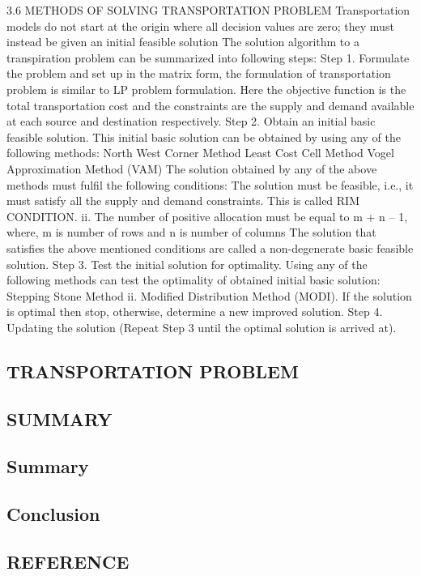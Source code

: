 \documentclass{article}
\begin{document}
3.6 METHODS OF SOLVING TRANSPORTATION PROBLEM 
Transportation models do not start at the origin where all decision values are zero; they must instead be given an initial feasible solution The solution algorithm to a transpiration problem can be summarized into following steps: 
Step 1. Formulate the problem and set up in the matrix form, the formulation of transportation problem is similar to LP problem formulation. Here the objective function is the total transportation cost and the constraints are the supply and demand available at each source and destination respectively. 
Step 2. Obtain an initial basic feasible solution. This initial basic solution can be obtained by using any of the following methods: 
North West Corner Method 
Least Cost Cell Method 
Vogel Approximation Method  (VAM)
The solution obtained by any of the above methods must fulfil the following conditions: 
The solution must be feasible, i.e., it must satisfy all the supply and demand constraints. This is called RIM CONDITION. 
ii. The number of positive allocation must be equal to m + n – 1, where, m is number of rows and n is number of columns
The solution that satisfies the above mentioned conditions are called a non-degenerate basic feasible solution. 
Step 3. Test the initial solution for optimality. Using any of the following methods can test the optimality of obtained initial basic solution: 
Stepping Stone Method 
ii. Modified Distribution Method (MODI).
If the solution is optimal then stop, otherwise, determine a new improved solution. 
Step 4. Updating the solution (Repeat Step 3 until the optimal solution is arrived at).



\newpage

\begin{center}
	\section{TRANSPORTATION PROBLEM}
\end{center}

\newpage

\begin{center}
	\section{SUMMARY}
\end{center}
\subsection{Summary}
\subsection{Conclusion}

\newpage

\begin{center}
	\section{REFERENCE}
\end{center}
\end{document}

